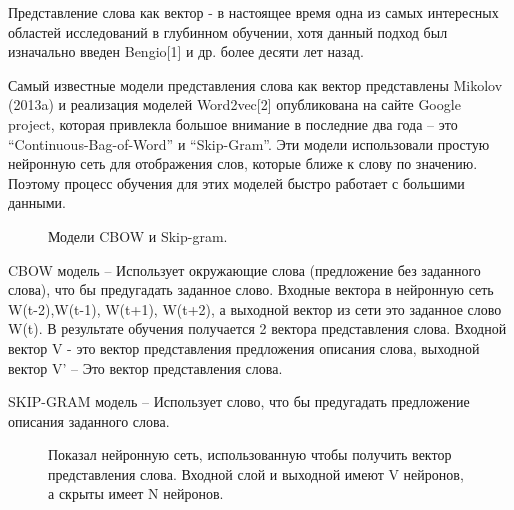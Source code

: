 \documentclass[12pt]{article}
\begin{document}
Представление слова как вектор - в настоящее время одна из самых интересных областей исследований в глубинном обучении, хотя данный подход был изначально введен Bengio[1] и др. более десяти лет назад.

	Самый известные модели представления слова как вектор представлены Mikolov (2013a) и реализация моделей Word2vec[2] опубликована на сайте Google project, которая привлекла большое внимание в последние два года – это “Continuous-Bag-of-Word” и “Skip-Gram”. Эти модели использовали простую нейронную сеть для отображения слов, которые ближе к слову по значению. Поэтому процесс обучения для этих моделей быстро работает с большими данными. 
	
	\begin{figure}[h]
		\noindent{}
		\caption{Модели CBOW и Skip-gram.}
		\label{figCurves}
	\end{figure}
	
CBOW модель – Использует окружающие слова (предложение без заданного слова), что бы предугадать заданное слово. Входные вектора в нейронную сеть W(t-2),W(t-1), W(t+1), W(t+2), а выходной вектор из сети это заданное слово W(t). В результате обучения получается 2 вектора представления слова. Входной вектор V - это вектор представления предложения описания слова, выходной вектор V’ – Это вектор представления слова.

SKIP-GRAM модель – Использует слово, что бы предугадать предложение описания заданного слова.

 	\begin{figure}[h]
		\noindent{}
		\caption{Показал нейронную сеть, использованную чтобы получить вектор представления слова. Входной слой и выходной имеют V нейронов, а скрыты имеет N нейронов.}
		\label{figCurves}
	\end{figure}
\end{document}
